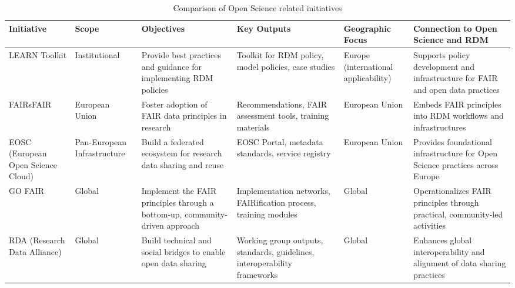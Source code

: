 \documentclass{article}
\begin{document}
\begin{table}[H]
    \centering
    \caption{Comparison of Open Science related initiatives}
    \label{tab:initiative_comparison}
    \begin{tabularx}{\textwidth}{|X|X|X|X|X|X|}
        \hline
        \textbf{Initiative}                & \textbf{Scope}              & \textbf{Objectives}                                                          & \textbf{Key Outputs}                                                          & \textbf{Geographic Focus}            & \textbf{Connection to Open Science and RDM}                                      \\
        \hline
        LEARN Toolkit                      & Institutional               & Provide best practices and guidance for implementing RDM policies            & Toolkit for RDM policy, model policies, case studies                          & Europe (international applicability) & Supports policy development and infrastructure for FAIR and open data practices  \\
        \hline
        FAIRsFAIR                          & European Union              & Foster adoption of FAIR data principles in research                          & Recommendations, FAIR assessment tools, training materials                    & European Union                       & Embeds FAIR principles into RDM workflows and infrastructures                    \\
        \hline
        EOSC (European Open Science Cloud) & Pan-European Infrastructure & Build a federated ecosystem for research data sharing and reuse              & EOSC Portal, metadata standards, service registry                             & European Union                       & Provides foundational infrastructure for Open Science practices across Europe    \\
        \hline
        GO FAIR                            & Global                      & Implement the FAIR principles through a bottom-up, community-driven approach & Implementation networks, FAIRification process, training modules              & Global                               & Operationalizes FAIR principles through practical, community-led activities      \\
        \hline
        RDA (Research Data Alliance)       & Global                      & Build technical and social bridges to enable open data sharing               & Working group outputs, standards, guidelines, interoperability frameworks     & Global                               & Enhances global interoperability and alignment of data sharing practices         \\

\end{tabularx}
\end{table}
\end{document}
